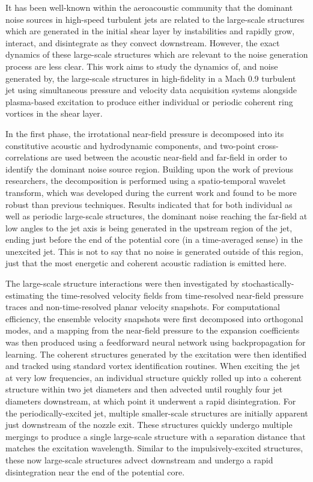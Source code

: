 It has been well-known within the aeroacoustic community that the dominant noise sources in high-speed turbulent jets are related to the large-scale structures which are generated in the initial shear layer by instabilities and rapidly grow, interact, and disintegrate as they convect downstream.
However, the exact dynamics of these large-scale structures which are relevant to the noise generation process are less clear.
This work aims to study the dynamics of, and noise generated by, the large-scale structures in high-fidelity in a Mach 0.9 turbulent jet using simultaneous pressure and velocity data acquisition systems alongside plasma-based excitation to produce either individual or periodic coherent ring vortices in the shear layer.

In the first phase, the irrotational near-field pressure is decomposed into its constitutive acoustic and hydrodynamic components, and two-point cross-correlations are used between the acoustic near-field and far-field in order to identify the dominant noise source region.
Building upon the work of previous researchers, the decomposition is performed using a spatio-temporal wavelet transform, which was developed during the current work and found to be more robust than previous techniques.
Results indicated that for both individual as well as periodic large-scale structures, the dominant noise reaching the far-field at low angles to the jet axis is being generated in the upstream region of the jet, ending just before the end of the potential core (in a time-averaged sense) in the unexcited jet.
This is not to say that no noise is generated outside of this region, just that the most energetic and coherent acoustic radiation is emitted here.

The large-scale structure interactions were then investigated by stochastically-estimating the time-resolved velocity fields from time-resolved near-field pressure traces and non-time-resolved planar velocity snapshots.
For computational efficiency, the ensemble velocity snapshots were first decomposed into orthogonal modes, and a mapping from the near-field pressure to the expansion coefficients was then produced using a feedforward neural network using backpropagation for learning.
The coherent structures generated by the excitation were then identified and tracked using standard vortex identification routines.
When exciting the jet at very low frequencies, an individual structure quickly rolled up into a coherent structure within two jet diameters and then advected until roughly four jet diameters downstream, at which point it underwent a rapid disintegration.
For the periodically-excited jet, multiple smaller-scale structures are initially apparent just downstream of the nozzle exit.
These structures quickly undergo multiple mergings to produce a single large-scale structure with a separation distance that matches the excitation wavelength.
Similar to the impulsively-excited structures, these now large-scale structures advect downstream and undergo a rapid disintegration near the end of the potential core. 

